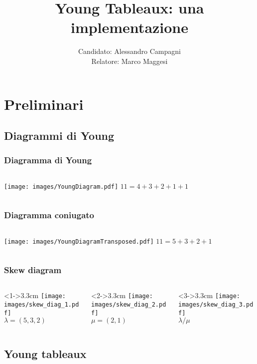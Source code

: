 \documentclass{beamer}
\title{Young Tableaux: una implementazione}
\author[Campagni]{Candidato: Alessandro Campagni \medskip \\Relatore:
  Marco Maggesi}
\date{}
\begin{document}
\begin{frame}
\titlepage
\end{frame}


\section{Preliminari}
\subsection{Diagrammi di Young}

\begin{frame}
\frametitle{Diagramma di Young}
\begin{columns}[T]
\column{5cm}
\texttt{[image: images/YoungDiagram.pdf]}
\column{5cm}
$11=4+3+2+1+1$
\end{columns}
\end{frame}

\begin{frame}
\frametitle{Diagramma coniugato}
\begin{columns}[T]
\column{5cm}
\texttt{[image: images/YoungDiagramTransposed.pdf]}
\column{5cm}
$11=5+3+2+1$
\end{columns}
\end{frame}

\begin{frame}
\frametitle{Skew diagram}
\centering
\begin{columns}
\begin{column}<1->{3.3cm}
\texttt{[image: images/skew\_diag\_1.pdf]}\\
$\lambda=(5,3,2)$
\end{column}
\begin{column}<2->{3.3cm}
\texttt{[image: images/skew\_diag\_2.pdf]}\\
$\mu=(2,1)$
\end{column}
\begin{column}<3->{3.3cm}
\texttt{[image: images/skew\_diag\_3.pdf]}\\
$\lambda / \mu$
\end{column}
\end{columns}
\end{frame}

\subsection{Young tableaux}
\end{document}
